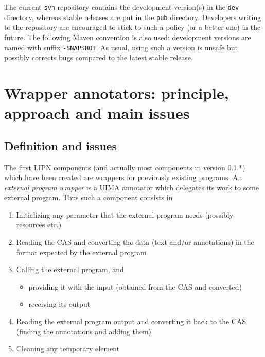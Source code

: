 \documentclass{article}
\newcommand{\versionSoft}{0.1.*}
\newenvironment{xenumerate}{
\begin{enumerate}
  \setlength{\itemsep}{.3\baselineskip}
  \setlength{\topsep}{0pt}
  \setlength{\parskip}{0pt}
  \setlength{\parsep}{0pt}
}{\end{enumerate}}
\newenvironment{xitemize}{
\begin{itemize}
  \setlength{\itemsep}{.3\baselineskip}
  \setlength{\topsep}{0pt}
  \setlength{\parskip}{0pt}
  \setlength{\parsep}{0pt}
}{\end{itemize}}
\begin{document}
The current {\tt svn} repository contains the development version(s) in the {\tt dev} directory, whereas stable releases are put in the {\tt pub} directory. Developers writing to the repository are encouraged to stick to such a policy (or a better one) in the future. The following Maven convention is also used: development versions are named with suffix {\tt -SNAPSHOT}. As usual, using such a version is unsafe but possibly corrects bugs compared to the latest stable release.






\section{Wrapper annotators: principle, approach and main issues}
\label{partWrapper}

\subsection{Definition and issues}

The first LIPN components (and actually most components in version \versionSoft) which have been created are wrappers for previously existing programs. An {\em external program wrapper} is a UIMA annotator which delegates its work to some external program. Thus such a component consists in
\begin{xenumerate}
\item Initializing any parameter that the external program needs (possibly resources etc.)
\item Reading the CAS and converting the data (text and/or annotations) in the format expected by the external program
\item Calling the external program, and
\begin{xitemize}
\item providing it with the input (obtained from the CAS and converted)
\item receiving its output
\end{xitemize}
\item Reading the external program output and converting it back to the CAS (finding the annotations and adding them)
\item Cleaning any temporary element 
\end{xenumerate}
\end{document}
